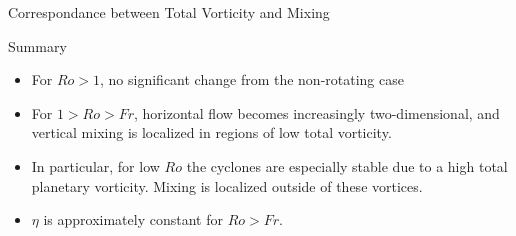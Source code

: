 \documentclass[aspecttatio=169]{beamer}
\begin{document}
\begin{frame}{Correspondance between Total Vorticity and Mixing}
    \emp

\end{frame}


\begin{frame}{Summary}

    \begin{itemize}
    \item For $Ro > 1$, no significant change from the non-rotating case
    \item For $1 > Ro > Fr$, horizontal flow becomes increasingly
    two-dimensional, and vertical mixing is localized in regions of low total
    vorticity. 
    \item In particular, for low $Ro$ the cyclones are especially stable due to
    a high total planetary vorticity. Mixing is localized outside of these
    vortices. 
    \item $\eta$ is approximately constant for $Ro > Fr$. 
    \end{itemize}

\end{frame}
\end{document}
